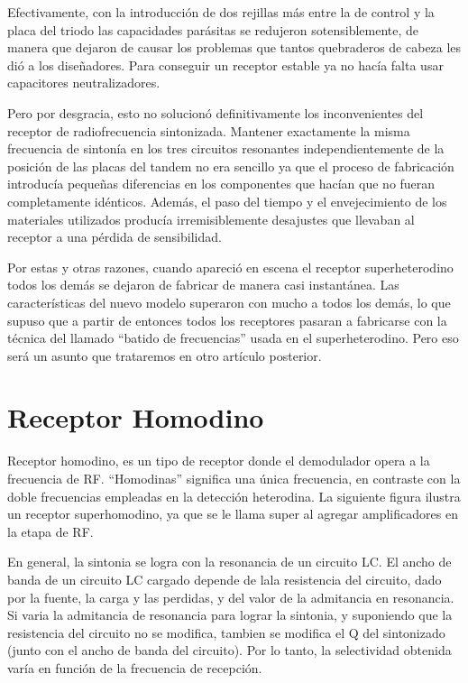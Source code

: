 \documentclass[a4paper,10pt,spanish]{report}
\let\sphinxpxdimen\pdfpxdimen\else\newdimen\sphinxpxdimen
\begin{document}
Efectivamente, con la introducción de dos rejillas más entre la de control y la placa del triodo las capacidades parásitas se redujeron sotensiblemente, de manera que dejaron de causar los problemas que tantos quebraderos de cabeza les dió a los diseñadores. Para conseguir un receptor estable ya no hacía falta usar capacitores neutralizadores.

\sphinxincludegraphics[width=588\sphinxpxdimen,height=226\sphinxpxdimen]{{receprfs4low}.png}

Pero por desgracia, esto no solucionó definitivamente los inconvenientes del receptor de radiofrecuencia sintonizada. Mantener exactamente la misma frecuencia de sintonía en los tres circuitos resonantes independientemente de la posición de las placas del tandem no era sencillo ya que el proceso de fabricación introducía pequeñas diferencias en los componentes que hacían que no fueran completamente idénticos. Además, el paso del tiempo y el envejecimiento de los materiales utilizados producía
irremisiblemente desajustes que llevaban al receptor a una pérdida de sensibilidad.

Por estas y otras razones, cuando apareció en escena el receptor superheterodino todos los demás se dejaron de fabricar de manera casi instantánea. Las características del nuevo modelo superaron con mucho a todos los demás, lo que supuso que a partir de entonces todos los receptores pasaran a fabricarse con la técnica del llamado “batido de frecuencias” usada en el superheterodino. Pero eso será un asunto que trataremos en otro artículo posterior.


\chapter{Receptor Homodino}
\label{\detokenize{introduccion/sistemas:Receptor-Homodino}}
Receptor homodino, es un tipo de receptor donde el demodulador opera a la frecuencia de RF. “Homodinas” significa una única frecuencia, en contraste con la doble frecuencias empleadas en la detección heterodina. La siguiente figura ilustra un receptor super\sphinxhyphen{}homodino, ya que se le llama super al agregar amplificadores en la etapa de RF.

\sphinxincludegraphics[width=919\sphinxpxdimen,height=270\sphinxpxdimen]{{homodino}.png}

En general, la sintonia se logra con la resonancia de un circuito LC. El ancho de banda de un circuito LC cargado depende de lala resistencia del circuito, dado por la fuente, la carga y las perdidas, y del valor de la admitancia en resonancia. Si varia la admitancia de resonancia para lograr la sintonia, y suponiendo que la resistencia del circuito no se modifica, tambien se modifica el Q del sintonizado (junto con el ancho de banda del circuito). Por lo tanto, la selectividad obtenida varía en
función de la frecuencia de recepción.
\end{document}
